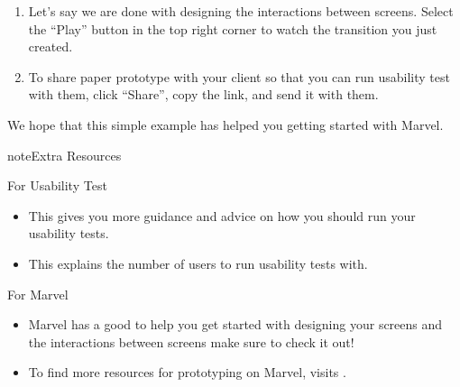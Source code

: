 \documentclass[letterpaper,10pt,english]{jupyterBook}
\begin{document}
\begin{enumerate}
\begin{itemize}
\end{itemize}

\item {} 
\sphinxAtStartPar
Let’s say we are done with designing the interactions between screens. Select the “Play” button in the top right
corner to watch the transition you just created.

\item {} 
\sphinxAtStartPar
To share paper prototype with your client so that you can run usability test with them, click “Share”, copy the
link, and send it with them. 

\end{enumerate}

\sphinxAtStartPar
We hope that this simple example has helped you getting started with Marvel.

\begin{sphinxadmonition}{note}{Extra Resources}

\sphinxAtStartPar
For Usability Test
\begin{itemize}
\item {} 
\sphinxAtStartPar
This  gives you more guidance and
advice on how you should run your usability tests.

\item {} 
\sphinxAtStartPar
This  explains the number of
users to run usability tests with.

\end{itemize}

\sphinxAtStartPar
For Marvel
\begin{itemize}
\item {} 
\sphinxAtStartPar
Marvel has a good  to help you get started
with designing your screens and the interactions between screens \sphinxhyphen{} make sure to check it out!

\item {} 
\sphinxAtStartPar
To find more resources for prototyping on Marvel, visits
.

\end{itemize}
\end{sphinxadmonition}
\end{document}
